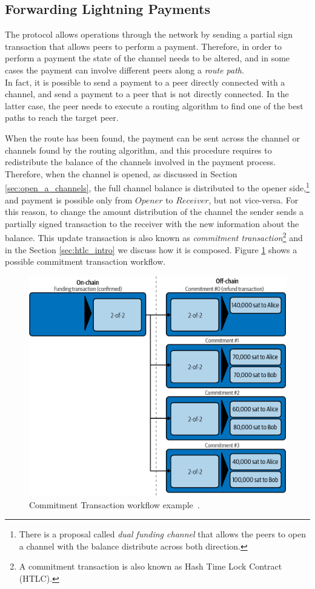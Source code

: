 \subsection{Forwarding Lightning Payments}
\label{sec:lightning_forwarding}

The {\LN} protocol allows operations through the network by sending a partial sign transaction that
allows peers to perform a payment.
Therefore, in order to perform a payment the state of the channel needs to be altered, and in some cases the payment can involve
different peers along a \emph{route path}.\\
In fact, it is possible to send a payment to a peer directly connected with a channel, and send a payment to a peer
that is not directly connected. In the latter case, the peer needs to execute a routing algorithm
to find one of the best paths to reach the target peer.

When the route has been found, the payment can be sent across the channel or channels found by the routing algorithm, and this procedure
requires to redistribute the balance of the channels involved in the payment process.\\
Therefore, when the channel is opened, as discussed in Section \ref{sec:open_a_channels}, the full channel balance
is distributed to the opener side,\footnote{There is a proposal called \emph{dual funding channel} that allows the peers to open a channel with the balance distribute across both direction.}
and payment is possible only from $Opener$ to $Receiver$, but not vice-versa. For this reason, to change the amount distribution
of the channel the sender sends a partially signed transaction to the receiver with the new information about the balance.
This update transaction is also known as \emph{commitment transaction}\footnote{A commitment transaction is also known as Hash Time Lock Contract (HTLC).} and in the Section \ref{sec:htlc_intro} we discuss how it is composed.
Figure \ref{fig:commitment_transaction_example} shows a possible commitment transaction workflow.

\begin{figure}[h]
  \begin{center}
  \includegraphics[width=0.6\columnwidth]{imgs/mtln_0706.png}
  \end{center}
    \caption{Commitment Transaction workflow example~\cite{lnbook}.}
  \label{fig:commitment_transaction_example}
\end{figure}


